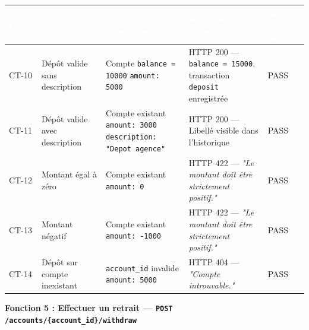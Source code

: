 \documentclass[12pt,a4paper]{article}
\begin{document}
\begin{longtable}{|L{1.6cm}|L{3.8cm}|L{5.2cm}|L{4.2cm}|L{1.8cm}|}
\hline
{}
\textbf{\textcolor{white}{Test Case ID}} & \textbf{\textcolor{white}{Test Case Description}} & \textbf{\textcolor{white}{Test Input (Test Case Value)}} & \textbf{\textcolor{white}{Expected Results}} & \textbf{\textcolor{white}{Test Case Status}} \\
\hline
CT-10 & Dépôt valide sans description & Compte \texttt{balance = 10000} \newline \texttt{amount: 5000} & HTTP 200 — \texttt{balance = 15000}, transaction \texttt{deposit} enregistrée & PASS \\
\hline
{}
CT-11 & Dépôt valide avec description & Compte existant \newline \texttt{amount: 3000} \newline \texttt{description: "Depot agence"} & HTTP 200 — Libellé visible dans l'historique & PASS \\
\hline
CT-12 & Montant égal à zéro & Compte existant \newline \texttt{amount: 0} & HTTP 422 — \textit{"Le montant doit être strictement positif."} & PASS \\
\hline
{}
CT-13 & Montant négatif & Compte existant \newline \texttt{amount: -1000} & HTTP 422 — \textit{"Le montant doit être strictement positif."} & PASS \\
\hline
CT-14 & Dépôt sur compte inexistant & \texttt{account\_id} invalide \newline \texttt{amount: 5000} & HTTP 404 — \textit{"Compte introuvable."} & PASS \\
\hline
\end{longtable}

\vspace{0.2cm}
{\bfseries\textcolor{danger}{Fonction 5 : Effectuer un retrait — \texttt{POST /accounts/\{account\_id\}/withdraw}}}
\vspace{0.1cm}
\end{document}
